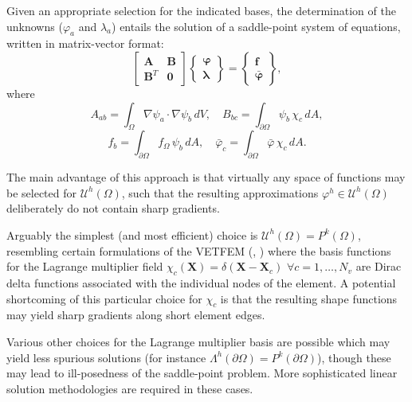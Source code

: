 Given an appropriate selection for the indicated bases, the determination of the unknowns ($\varphi_a$ and $\lambda_a$) entails the solution of a saddle-point system of equations, written in matrix-vector format:
\begin{equation}
	\left[ \begin{array}{cc} \mathbf{A} & \mathbf{B} \\ \mathbf{B}^T & \mathbf{0} \end{array} \right] \left\{ \begin{array}{c} \boldsymbol{\varphi} \\ \boldsymbol{\lambda} \end{array} \right\} = \left\{ \begin{array}{c} \mathbf{f} \\ \bar{\boldsymbol{\varphi}} \end{array} \right\},
\end{equation}
where
\begin{equation}
	A_{ab} = \int_{\Omega} \nabla \psi_a \cdot \nabla \psi_b \, dV, \quad B_{bc} = \int_{\partial \Omega} \psi_b \, \chi_c \, dA,
\end{equation}
\begin{equation}
	f_{b} = \int_{\partial \Omega} f_\Omega \, \psi_b \, dA, \quad \bar{\varphi}_{c} = \int_{\partial \Omega} \bar{\varphi} \, \chi_c \, dA.
\end{equation}

	The main advantage of this approach is that virtually any space of functions may be selected for $\mathcal{U}^h (\Omega)$, such that the resulting approximations $\varphi^h \in \mathcal{U}^h (\Omega)$ deliberately do not contain sharp gradients.
	
	Arguably the simplest (and most efficient) choice is $\mathcal{U}^h (\Omega) = P^{k} (\Omega)$, resembling certain formulations of the VETFEM (\cite{Rashid:00}, \cite{Rashid:06}) where the basis functions for the Lagrange multiplier field $\chi_c (\mathbf{X}) = \delta (\mathbf{X} - \mathbf{X}_c) \, \, \forall c = 1, \ldots, N_v$ are Dirac delta functions associated with the individual nodes of the element. A potential shortcoming of this particular choice for $\chi_c$ is that the resulting shape functions may yield sharp gradients along short element edges.
	
	Various other choices for the Lagrange multiplier basis are possible which may yield less spurious solutions (for instance $\Lambda^h (\partial \Omega) = P^{k} (\partial \Omega)$), though these may lead to ill-posedness of the saddle-point problem. More sophisticated linear solution methodologies are required in these cases.

